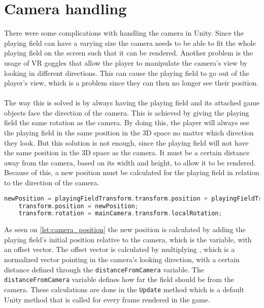 \section{Camera handling}
There were some complications with handling the camera in Unity.
Since the playing field can have a varying size the camera needs to be able to fit the whole playing field on the screen such that it can be rendered.
Another problem is the usage of VR goggles that allow the player to manipulate the camera's view by looking in different directions.
This can cause the playing field to go out of the player's view, which is a problem since they can then no longer see their position.
\\\\
The way this is solved is by always having the playing field and its attached game objects face the direction of the camera.
This is achieved by giving the playing field the same rotation as the camera.
By doing this, the player will always see the playing field in the same position in the 3D space no matter which direction they look.
But this solution is not enough, since the playing field will not have the same position in the 3D space as the camera.
It must be a certain distance away from the camera, based on its width and height, to allow it to be rendered.
Because of this, a new position must be calculated for the playing field in relation to the direction of the camera.
\begin{lstlisting}[caption={Calculating and setting the position and rotation of the playing field}, captionpos=b,language=C,label={lst:camera_position}]
    newPosition = playingFieldTransform.transform.position + playingFieldTransform.transform.forward * distanceFromCamera;
    transform.position = newPosition;
    transform.rotation = mainCamera.transform.localRotation;
\end{lstlisting}
As seen on \autoref{lst:camera_position} the new position is calculated by adding the playing field's initial position relative to the camera, which is the  variable, with an offset vector.
The offset vector is calculated by multiplying , which is a normalized vector pointing in the camera's looking direction, with a certain distance defined through the \texttt{distanceFromCamera} variable.
The \texttt{distanceFromCamera} variable defines how far the field should be from the camera.
These calculations are done in the \texttt{Update} method which is a default Unity method that is called for every frame rendered in the game.
